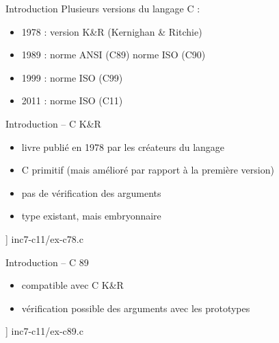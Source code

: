 %
%

\def\inc{inc7-c11}




\begin {frame} {Introduction}
    Plusieurs versions du langage C :

    \begin {itemize}
	\item 1978 : version K\&R (Kernighan \& Ritchie)
	\item 1989 : norme ANSI (C89) \implique norme ISO (C90)
	\item 1999 : norme ISO (C99)
	\item 2011 : norme ISO (C11)
    \end {itemize}

\end {frame}

\begin {frame} [fragile] {Introduction -- C K\&R}
    \begin {itemize}
	\item livre publié en 1978 par les créateurs du langage
	\item C primitif (mais amélioré par rapport à la première version)
	\item pas de vérification des arguments
	\item type  existant, mais embryonnaire
    \end {itemize}

    \scriptsize\lstmonstyle] {\inc/ex-c78.c}
\end{frame}

\begin {frame} [fragile] {Introduction -- C 89}
    \begin {itemize}
	\item compatible avec C K\&R
	\item vérification possible des arguments avec les prototypes
    \end {itemize}

    \scriptsize\lstmonstyle] {\inc/ex-c89.c}
\end{frame}

